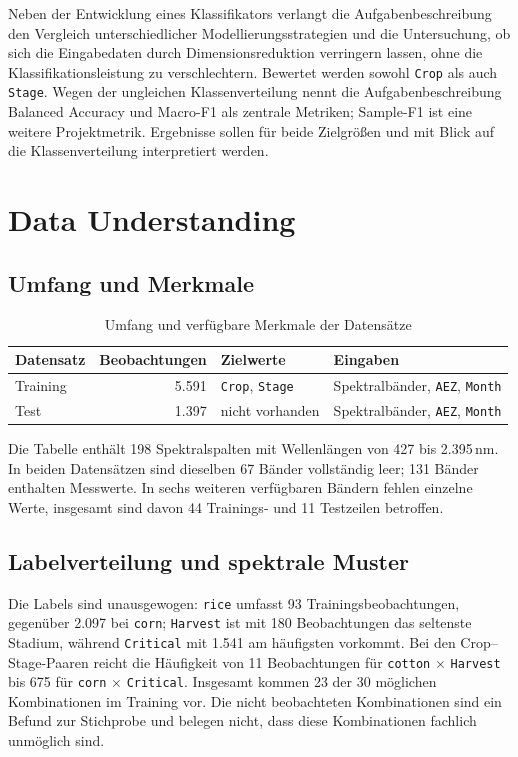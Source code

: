 \documentclass[11pt,a4paper]{article}
\begin{document}
Neben der Entwicklung eines Klassifikators verlangt die Aufgabenbeschreibung den Vergleich
unterschiedlicher Modellierungsstrategien und die Untersuchung, ob sich die Eingabedaten durch
Dimensionsreduktion verringern lassen, ohne die Klassifikationsleistung zu verschlechtern.
Bewertet werden sowohl \texttt{Crop} als auch \texttt{Stage}. Wegen der ungleichen
Klassenverteilung nennt die Aufgabenbeschreibung Balanced Accuracy und Macro-F1 als zentrale
Metriken; Sample-F1 ist eine weitere Projektmetrik. Ergebnisse sollen für beide Zielgrößen und
mit Blick auf die Klassenverteilung interpretiert werden.

\section{Data Understanding}

\subsection{Umfang und Merkmale}

\begin{table}[htbp]
\centering
\caption{Umfang und verfügbare Merkmale der Datensätze}
\begin{tabularx}{\textwidth}{l r l X}
\toprule
Datensatz & Beobachtungen & Zielwerte & Eingaben \\
\midrule
Training & 5.591 & \texttt{Crop}, \texttt{Stage} & Spektralbänder, \texttt{AEZ}, \texttt{Month} \\
Test & 1.397 & nicht vorhanden & Spektralbänder, \texttt{AEZ}, \texttt{Month} \\
\bottomrule
\end{tabularx}
\end{table}

Die Tabelle enthält 198 Spektralspalten mit Wellenlängen von 427 bis 2.395\,nm. In beiden
Datensätzen sind dieselben 67 Bänder vollständig leer; 131 Bänder enthalten Messwerte. In sechs
weiteren verfügbaren Bändern fehlen einzelne Werte, insgesamt sind davon 44 Trainings- und 11
Testzeilen betroffen.

\subsection{Labelverteilung und spektrale Muster}

Die Labels sind unausgewogen: \texttt{rice} umfasst 93 Trainingsbeobachtungen, gegenüber 2.097
bei \texttt{corn}; \texttt{Harvest} ist mit 180 Beobachtungen das seltenste Stadium, während
\texttt{Critical} mit 1.541 am häufigsten vorkommt. Bei den Crop--Stage-Paaren reicht die
Häufigkeit von 11 Beobachtungen für \texttt{cotton} $\times$ \texttt{Harvest} bis 675 für
\texttt{corn} $\times$ \texttt{Critical}. Insgesamt kommen 23 der 30 möglichen Kombinationen
im Training vor. Die nicht beobachteten Kombinationen sind ein Befund zur Stichprobe und
belegen nicht, dass diese Kombinationen fachlich unmöglich sind.
\end{document}
